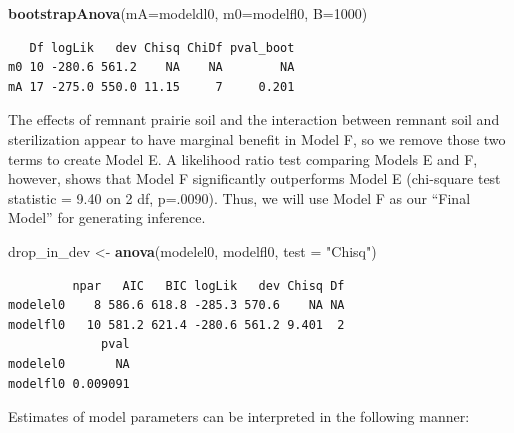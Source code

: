 \documentclass[
]{krantz}
\newenvironment{Shaded}{\begin{snugshade}}{\end{snugshade}}
\newcommand{\DataTypeTok}[1]{\textcolor[rgb]{0.27,0.27,0.27}{#1}}
\newcommand{\DecValTok}[1]{\textcolor[rgb]{0.06,0.06,0.06}{#1}}
\newcommand{\KeywordTok}[1]{\textcolor[rgb]{0.27,0.27,0.27}{\textbf{#1}}}
\newcommand{\NormalTok}[1]{#1}
\newcommand{\StringTok}[1]{\textcolor[rgb]{0.5,0.5,0.5}{#1}}
\begin{document}
\begin{Shaded}
\begin{Highlighting}[]
\KeywordTok{bootstrapAnova}\NormalTok{(}\DataTypeTok{mA=}\NormalTok{modeldl0, }\DataTypeTok{m0=}\NormalTok{modelfl0, }\DataTypeTok{B=}\DecValTok{1000}\NormalTok{)}
\end{Highlighting}
\end{Shaded}

\begin{verbatim}
   Df logLik   dev Chisq ChiDf pval_boot
m0 10 -280.6 561.2    NA    NA        NA
mA 17 -275.0 550.0 11.15     7     0.201
\end{verbatim}

The effects of remnant prairie soil and the interaction between remnant soil and sterilization appear to have marginal benefit in Model F, so we remove those two terms to create Model E. A likelihood ratio test comparing Models E and F, however, shows that Model F significantly outperforms Model E (chi-square test statistic = 9.40 on 2 df, p=.0090). Thus, we will use Model F as our ``Final Model'' for generating inference.

\begin{Shaded}
\begin{Highlighting}[]
\NormalTok{drop_in_dev <-}\StringTok{ }\KeywordTok{anova}\NormalTok{(modelel0, modelfl0, }\DataTypeTok{test =} \StringTok{"Chisq"}\NormalTok{)}
\end{Highlighting}
\end{Shaded}

\begin{verbatim}
         npar   AIC   BIC logLik   dev Chisq Df
modelel0    8 586.6 618.8 -285.3 570.6    NA NA
modelfl0   10 581.2 621.4 -280.6 561.2 9.401  2
             pval
modelel0       NA
modelfl0 0.009091
\end{verbatim}

Estimates of model parameters can be interpreted in the following manner:
\end{document}

